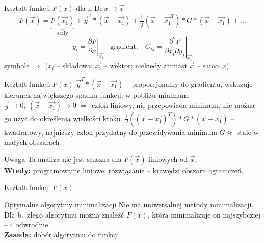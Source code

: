   \begin{frame}{Ksztalt funkcji $ F(x) $}
    dla n-D: $ x \to \vec{x} $
    \begin{displaymath}
      F(\vec{x}) = \underbrace{F(\vec{x_1})}_{\text{stały}} +
      \vec{g}^T * (\vec{x} - \vec{x_1}) +
      \frac{1}{2}(\vec{x} - \vec{x_1}^T) * G * (\vec{x} - \vec{x_1}) + \dots
    \end{displaymath}
    \begin{displaymath}
      g_i = \left. \frac{\partial F}{\partial x} \right|_{\vec{x_1}} \text{-- gradient;}\quad
      G_{ij} = \left. \frac{\partial^2 F}{\partial x_i \partial y_j} \right|_{\vec{x_1}}
    \end{displaymath}
    symbole $ \Rightarrow $ ($ x_i $ -- składowa; $ \vec{x_i} $
    -- wektor; niekiedy zamiast $ \vec{x} $ -- samo~$ x $)

  \end{frame}

  \begin{frame}{Ksztalt funkcji $ F(x) $}
    $ \vec{g}^T * (\vec{x} - \vec{x_1}) $ -- proporcjonalny do
    gradientu, wskazuje kierunek największego spadku funkcji,
    w pobliżu minimum: $ \vec{g} \to 0{,}\ (\vec{x} - \vec{x_1}) \to 0
    \; \Rightarrow $ człon liniowy, nie przepowiada minimum,
    nie można go użyć do określenia wielkości kroku.
    $ \frac{1}{2}((\vec{x} - \vec{x_1})^T) * G * (\vec{x} - \vec{x_1}) $
    -- kwadratowy, najniższy człon przydatny do przewidywania minimum
    $ G \approx $ stale w małych obszarach
    \begin{alertblock}{Uwaga}
      Ta analiza nie jest słuszna dla $ F(\vec{x}) $ liniowych
      od $ \vec{x} $;\\
      \textbf{Wtedy:} programowanie liniowe, rozwiązanie --
      krawędzi obszaru ograniczeń.
    \end{alertblock}
  \end{frame}

  \begin{frame}{Ksztalt funkcji $ F(x) $}
    \begin{block}{Optymalne algorytmy minimalizacji}
      Nie ma uniwersalnej metody minimalizacji. Dla b.~złego
      algorytmu można znaleźć $ F(x) $, którą minimalizuje on
      najszybcziej -- i~odwrodnie.\\
      \textbf{Zasada:} dobór algorytmu do funkcji.

    \end{block}

  \end{frame}
